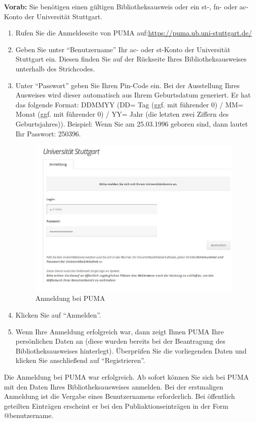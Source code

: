 \textbf{Vorab:} Sie benötigen einen gültigen Bibliotheksausweis oder ein st-, fn- oder ac-Konto der Universität Stuttgart.
\begin{enumerate}
    \item Rufen Sie die Anmeldeseite von PUMA auf:\newline \url{https://puma.ub.uni-stuttgart.de/}
    \item Geben Sie unter \enquote{Benutzername} Ihr ac- oder st-Konto der Universität Stuttgart ein. Diesen finden Sie auf der Rückseite Ihres Bibliotheksausweises unterhalb des Strichcodes. %
    \item Unter  \enquote{Passwort} geben Sie Ihren Pin-Code ein. Bei der Ausstellung Ihres Ausweises wird dieser automatisch aus Ihrem Geburtsdatum generiert. Er hat das folgende Format: DDMMYY (DD= Tag (ggf. mit führender 0) / MM= Monat (ggf. mit führender 0) / YY= Jahr (die letzten zwei Ziffern des Geburtsjahres)). Beispiel: Wenn Sie am 25.03.1996 geboren sind, dann lautet Ihr Passwort: 250396.
 \begin{figure}[ht]
 \centering
 \includegraphics[scale=0.25]{puma-002}
 \caption{Anmeldung bei PUMA}
 \label{figure2}
\end{figure}  
    \item Klicken Sie auf \enquote{Anmelden}.
    \item Wenn Ihre Anmeldung erfolgreich war, dann zeigt Ihnen PUMA Ihre persönlichen Daten an (diese wurden bereits bei der Beantragung des Bibliotheksausweises hinterlegt). Überprüfen Sie die vorliegenden Daten und klicken Sie anschließend auf \enquote{Registrieren}.
\end{enumerate}
Die Anmeldung bei PUMA war erfolgreich. Ab sofort können Sie sich bei PUMA mit den Daten Ihres Bibliotheksausweises anmelden. \newline
Bei der erstmaligen Anmeldung ist die Vergabe eines Benutzernamens erforderlich. Bei öffentlich geteilten Einträgen erscheint er bei den Publiaktionseinträgen in der Form @benutzername.

